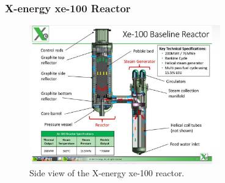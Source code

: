 \begin{frame}
  \frametitle{X-energy xe-100 Reactor}
  \begin{figure}[htbp!]
    \begin{center}
      \includegraphics[height=6cm]{./images/xe-100_des.png}
    \end{center}
          \caption{Side view of the X-energy xe-100 reactor. \cite{xe100}}
    \label{fig:xe100_side_view}
  \end{figure}
\end{frame}
